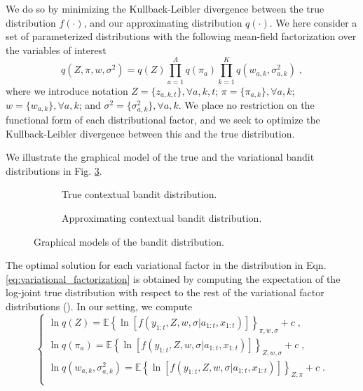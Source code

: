 \documentclass{article}
\newcommand{\eValue}[1]{\mathbb{E}\left\{ #1 \right\}}
\begin{document}
We do so by minimizing the Kullback-Leibler divergence between the true distribution $f(\cdot)$, and our approximating distribution $q(\cdot)$. We 
here consider
a set of parameterized distributions with the following mean-field factorization over the variables of interest
\begin{equation}
q(Z, \pi, w, \sigma^2)=q(Z) \prod_{a=1}^A q(\pi_a) \prod_{k=1}^{K} q(w_{a,k}, \sigma_{a,k}^2) \; ,
\label{eq:variational_factorization}
\end{equation}
where we introduce notation 
  $Z=\{z_{a,k,t}\}, \forall a,k,t$; 
  $\pi=\{\pi_{a,k}\}, \forall a,k$; 
  $w=\{w_{a,k}\}, \forall a,k$; 
  and 
  $\sigma^2=\{\sigma_{a,k}^2\}, \forall a,k$. 
We place no restriction on the functional form of each distributional factor, and we seek to optimize the Kullback-Leibler divergence between this and the true distribution.

We illustrate the graphical model of the true and the variational bandit distributions in Fig. \ref{fig:graphical_bandit}.

\begin{figure}[h]
	\centering
	\begin{subfigure}[b]{0.49\textwidth}
		\begin{center}
			
		\end{center}
		\label{fig:true_bandit}
		\caption{True contextual bandit distribution.}
	\end{subfigure}
	\begin{subfigure}[b]{0.49\textwidth}	
		\begin{center}
			
		\end{center}
		\label{fig:variational_bandit}
		\caption{Approximating contextual bandit distribution.}
	\end{subfigure}
	\caption{Graphical models of the bandit distribution.}
	\label{fig:graphical_bandit}
\end{figure}

The optimal solution for each variational factor in the distribution in Eqn. \ref{eq:variational_factorization} is obtained by computing the expectation of the log-joint true distribution with respect to the rest of the variational factor distributions (\cite{b-Bishop2006}). In our setting, we compute
\begin{equation}
\begin{cases}
\ln q(Z) =\eValue{\ln\left[f(y_{1:t}, Z, w, \sigma|a_{1:t}, x_{1:t})\right]}_{\pi, w, \sigma}+c \;, \\
\ln q(\pi_a) =\eValue{\ln\left[f(y_{1:t}, Z, w, \sigma|a_{1:t}, x_{1:t})\right]}_{Z, w, \sigma}+c \;,\\
\ln q(w_{a,k},\sigma_{a,k}^2) =\eValue{\ln\left[f(y_{1:t}, Z, w, \sigma|a_{1:t}, x_{1:t})\right]}_{Z,\pi}+c \;.\\
\end{cases}
\end{equation}
\end{document}
